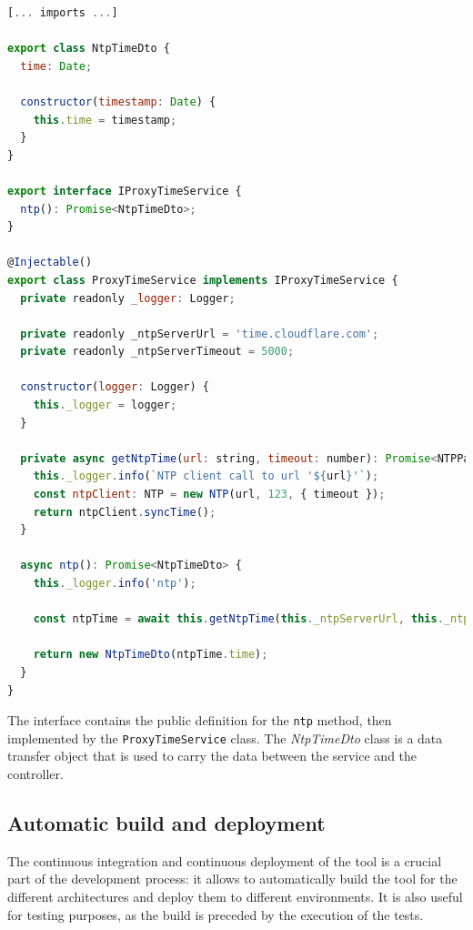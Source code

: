 \noindent\begin{minipage}{\linewidth}
  \vspace{0.5cm}
  \begin{lstlisting}[language=Javascript, caption={Proxy service class}, label={lst:proxy-service}]
[... imports ...]

export class NtpTimeDto {
  time: Date;

  constructor(timestamp: Date) {
    this.time = timestamp;
  }
}

export interface IProxyTimeService {
  ntp(): Promise<NtpTimeDto>;
}

@Injectable()
export class ProxyTimeService implements IProxyTimeService {
  private readonly _logger: Logger;

  private readonly _ntpServerUrl = 'time.cloudflare.com';
  private readonly _ntpServerTimeout = 5000;

  constructor(logger: Logger) {
    this._logger = logger;
  }

  private async getNtpTime(url: string, timeout: number): Promise<NTPPacket> {
    this._logger.info(`NTP client call to url '${url}'`);
    const ntpClient: NTP = new NTP(url, 123, { timeout });
    return ntpClient.syncTime();
  }

  async ntp(): Promise<NtpTimeDto> {
    this._logger.info('ntp');

    const ntpTime = await this.getNtpTime(this._ntpServerUrl, this._ntpServerTimeout);

    return new NtpTimeDto(ntpTime.time);
  }
}
\end{lstlisting}
\end{minipage}

The interface contains the public definition for the \texttt{ntp} method, then implemented by the \texttt{ProxyTimeService} class. The \textit{NtpTimeDto} class is a data transfer object that is used to carry the data between the service and the controller.

\subsection{Automatic build and deployment}

The continuous integration and continuous deployment of the tool is a crucial part of the development process: it allows to automatically build the tool for the different architectures and deploy them to different environments. It is also useful for testing purposes, as the build is preceded by the execution of the tests.

